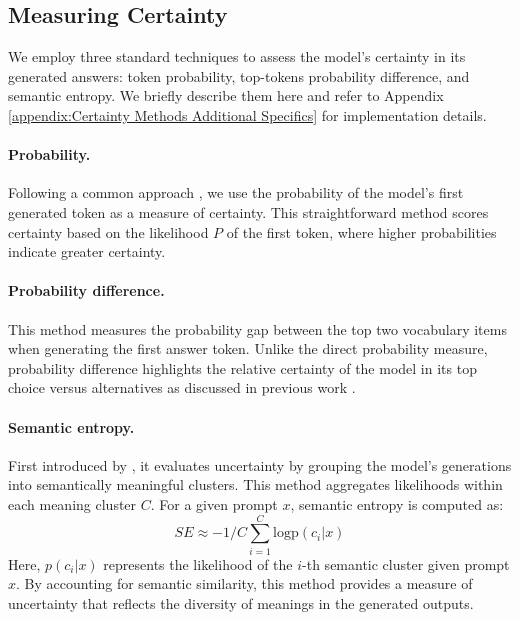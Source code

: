 \subsection{Measuring Certainty}\label{subsec:measuring_uncertainty}

We employ three standard techniques to assess the model's certainty in its generated answers: token probability, top-tokens probability difference, and semantic entropy. 
We briefly describe them here and refer to 
Appendix \ref{appendix:Certainty Methods Additional Specifics} for implementation details.

\paragraph{Probability.} 
Following a common approach \citep{Prompting_GPT-3_To_Be_Reliable,ye2022unreliability, feng2024don}, we use the probability of the model's first generated token as a measure of certainty. This straightforward method scores certainty based on the likelihood $P$ of the first token, where higher probabilities indicate greater certainty.

\paragraph{Probability difference.}
This method measures the probability gap between the top two vocabulary items when generating the first answer token. 
Unlike the direct probability measure, probability difference highlights the relative certainty of the model in its top choice versus alternatives as discussed in previous work \cite{huang2023look}.


\paragraph{Semantic entropy.}
First introduced by \citet{kuhn2023semantic}, it evaluates uncertainty by grouping the model's generations into semantically meaningful clusters. 
This method aggregates likelihoods within each meaning cluster $C$. For a given prompt $x$, semantic entropy is computed as:
%
\begin{equation}
SE \approx -1/C\sum_{i=1}^{C}\text{logp}(c_i|x)
\end{equation}
%
%
Here, $p(c_i|x)$  represents the likelihood of the $i$-th semantic cluster given prompt $x$. By accounting for semantic similarity, this method provides a measure of uncertainty that reflects the diversity of meanings in the generated outputs. 



